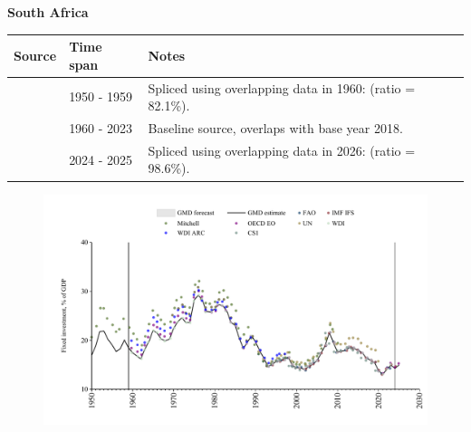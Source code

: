 \documentclass[12pt,a4paper,landscape]{article}
\begin{document}
\begin{adjustbox}{max totalsize={\paperwidth}{\paperheight},center}
\begin{minipage}[t][\textheight][t]{\textwidth}
\vspace*{0.5cm}
{}
\begin{center}
{\Large\bfseries South Africa}
\end{center}
\vspace{0.5cm}
\begin{table}[H]
\centering
\small
\begin{tabular}{|l|l|l|}
\hline
\textbf{Source} & \textbf{Time span} & \textbf{Notes} \\
\hline
\rowcolor{white}\cite{Mitchell}& 1950 - 1959 &Spliced using overlapping data in 1960: (ratio = 82.1\%).\\
\rowcolor{lightgray}\cite{WDI}& 1960 - 2023 &Baseline source, overlaps with base year 2018.\\
\rowcolor{white}\cite{OECD_EO}& 2024 - 2025 &Spliced using overlapping data in 2026: (ratio = 98.6\%).\\
\hline
\end{tabular}
\end{table}
\begin{figure}[H]
\centering
\includegraphics[width=\textwidth,height=0.6\textheight,keepaspectratio]{graphs/ZAF_finv_GDP.pdf}
\end{figure}
\end{minipage}
\end{adjustbox}
\end{document}
